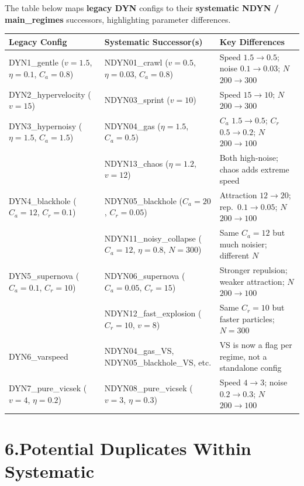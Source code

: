 \documentclass[10pt,landscape]{article}
\begin{document}
The table below maps \textbf{legacy DYN} configs to their \textbf{systematic NDYN / main\_regimes}
successors, highlighting parameter differences.

\begin{center}
\small
\begin{tabular}{l l l}
\toprule
\textbf{Legacy Config} & \textbf{Systematic Successor(s)} & \textbf{Key Differences} \\
\midrule
\rowcolor{dup}
DYN1\_gentle ($v{=}1.5$, $\eta{=}0.1$, $C_a{=}0.8$) 
  & NDYN01\_crawl ($v{=}0.5$, $\eta{=}0.03$, $C_a{=}0.8$)
  & Speed $1.5{\to}0.5$; noise $0.1{\to}0.03$; $N$ $200{\to}300$ \\
\rowcolor{dup}
DYN2\_hypervelocity ($v{=}15$)
  & NDYN03\_sprint ($v{=}10$) 
  & Speed $15{\to}10$; $N$ $200{\to}300$ \\
\rowcolor{dup}
DYN3\_hypernoisy ($\eta{=}1.5$, $C_a{=}1.5$)
  & NDYN04\_gas ($\eta{=}1.5$, $C_a{=}0.5$)
  & $C_a$ $1.5{\to}0.5$; $C_r$ $0.5{\to}0.2$; $N$ $200{\to}100$ \\
  & NDYN13\_chaos ($\eta{=}1.2$, $v{=}12$)
  & Both high-noise; chaos adds extreme speed \\
\rowcolor{dup}
DYN4\_blackhole ($C_a{=}12$, $C_r{=}0.1$)
  & NDYN05\_blackhole ($C_a{=}20$, $C_r{=}0.05$) 
  & Attraction $12{\to}20$; rep.\ $0.1{\to}0.05$; $N$ $200{\to}100$ \\
  & NDYN11\_noisy\_collapse ($C_a{=}12$, $\eta{=}0.8$, $N{=}300$) 
  & Same $C_a{=}12$ but much noisier; different $N$ \\
\rowcolor{dup}
DYN5\_supernova ($C_a{=}0.1$, $C_r{=}10$)
  & NDYN06\_supernova ($C_a{=}0.05$, $C_r{=}15$)
  & Stronger repulsion; weaker attraction; $N$ $200{\to}100$ \\
  & NDYN12\_fast\_explosion ($C_r{=}10$, $v{=}8$)
  & Same $C_r{=}10$ but faster particles; $N{=}300$ \\
\rowcolor{dup}
DYN6\_varspeed
  & NDYN04\_gas\_VS, NDYN05\_blackhole\_VS, etc.
  & VS is now a flag per regime, not a standalone config \\
\rowcolor{dup}
DYN7\_pure\_vicsek ($v{=}4$, $\eta{=}0.2$)
  & NDYN08\_pure\_vicsek ($v{=}3$, $\eta{=}0.3$)
  & Speed $4{\to}3$; noise $0.2{\to}0.3$; $N$ $200{\to}100$ \\
\bottomrule
\end{tabular}
\end{center}

\section*{6.\quad Potential Duplicates Within Systematic}
\end{document}
